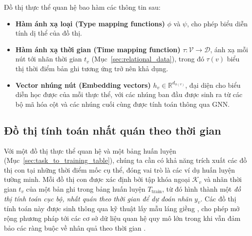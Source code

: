 Đồ thị thực thể quan hệ bao hàm các thông tin sau:
\begin{itemize}
\item \textbf{Hàm ánh xạ loại (Type mapping functions)} $\phi$ và $\psi$, cho phép biểu diễn tính dị thể của đồ thị.
\item \textbf{Hàm ánh xạ thời gian (Time mapping function)} $\tau:\mathcal{V}\rightarrow\mathcal{D}$, ánh xạ mỗi nút tới nhãn thời gian $t_v$ (Mục~\ref{sec:relational_data}), trong đó $\tau(v)$ biểu thị thời điểm bản ghi tương ứng trở nên khả dụng.
\item \textbf{Vector nhúng nút (Embedding vectors)} $h_v\in\mathbb{R}^{d_{\phi(v)}}$, đại diện cho biểu diễn học được của mỗi thực thể, với các nhúng ban đầu được sinh ra từ các bộ mã hóa cột và các nhúng cuối cùng được tính toán thông qua GNN.
\end{itemize}

\subsection{Đồ thị tính toán nhất quán theo thời gian} \label{sec:time-consistent}
Với một đồ thị thực thể quan hệ và một bảng huấn luyện (Mục~\ref{sec:task_to_training_table}), chúng ta cần có khả năng trích xuất các đồ thị con tại những thời điểm mốc cụ thể, đóng vai trò là các ví dụ huấn luyện tường minh. Mỗi đồ thị con được xác định bởi tập khóa ngoại $\mathcal{K}_v$ và nhãn thời gian $t_v$ của một bản ghi trong bảng huấn luyện $T_{\text{train}}$, từ đó hình thành một \textit{đồ thị tính toán cục bộ, nhất quán theo thời gian để dự đoán nhãn} $y_v$. Các đồ thị tính toán này được sinh thông qua kỹ thuật lấy mẫu láng giềng \cite{hamilton2017inductive}, cho phép mở rộng phương pháp tới các cơ sở dữ liệu quan hệ quy mô lớn trong khi vẫn đảm bảo các ràng buộc về nhân quả theo thời gian \cite{wang2021time}.

